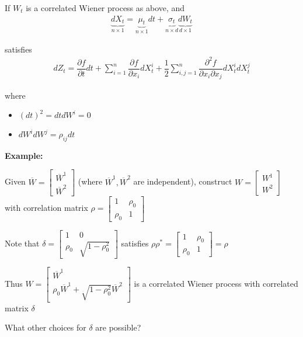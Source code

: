 \begin{theo}{}
  If $W_t$ is a correlated Wiener process as above, and 
  \begin{equation*}
    \begin{gathered}
      \underbrace{dX_t}_{n\times 1} = \underbrace{\mu_t}_{n\times 1}dt+\underbrace{\sigma_t}_{n\times d}\underbrace{dW_t}_{d\times 1}
    \end{gathered}
  \end{equation*}\par
  \noindent satisfies
  \begin{equation*}
    \begin{gathered}
      dZ_t = \dfrac{\partial  f}{\partial t}dt + \sum_{i=1}^{n}\dfrac{\partial f}{\partial x_i}dX_t^i +\dfrac{1}{2}\sum_{i,j=1}^{n}\dfrac{\partial^2 f}{\partial x_i\partial x_j}dX_t^idX_t^j
    \end{gathered}
  \end{equation*}\par
  \noindent where\par
  \begin{itemize}
    \item $(dt)^2 = dtdW^i = 0$
    \item $dW^idW^j = \rho_{ij}dt$
  \end{itemize}
\end{theo}
\par\bigskip
\noindent\textbf{Example:}\par
\noindent Given $\overline{W} = \begin{bmatrix}\overline{W}^1\\\overline{W}^2\end{bmatrix}$ (where $\overline{W}^1, \overline{W}^2$ are independent), construct $W = \begin{bmatrix}W^1\\W^2\end{bmatrix}$ with correlation matrix $\rho = \begin{bmatrix}1&\rho_0\\\rho_0&1\end{bmatrix}$
\par\bigskip
\noindent Note that $\delta = \begin{bmatrix}1&0\\\rho_0&\sqrt{1-\rho_0^2}\end{bmatrix}$ satisfies $\rho\rho^* = \begin{bmatrix}1&\rho_0\\\rho_0&1\end{bmatrix} = \rho$\par
\noindent Thus $W = \begin{bmatrix}\overline{W}^1\\\rho_0\overline{W}^1+\sqrt{1-\rho_0^2}\overline{W}^2\end{bmatrix}$ is a correlated Wiener process with correlated matrix $\delta$
\par\bigskip
\noindent What other choices for $\delta$ are possible?
